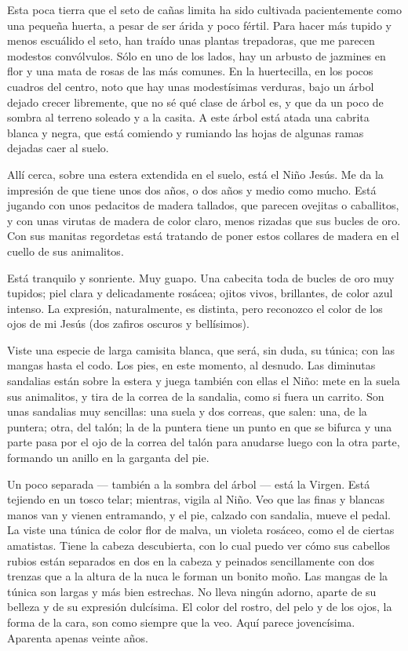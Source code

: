 \documentclass[12pt]{book} %
\begin{document}
Esta poca tierra que el seto de cañas limita ha sido cultivada pacientemente como una pequeña huerta, a pesar de ser árida y poco fértil. Para hacer más tupido y menos escuálido el seto, han traído unas plantas trepadoras, que me parecen modestos convólvulos. Sólo en uno de los lados, hay un arbusto de jazmines en flor y una mata de rosas de las más comunes. En la huertecilla, en los pocos cuadros del centro, noto que hay unas modestísimas verduras, bajo un árbol dejado crecer libremente, que no sé qué clase de árbol es, y que da un poco de sombra al terreno soleado y a la casita. A este árbol está atada una cabrita blanca y negra, que está comiendo y rumiando las hojas de algunas ramas dejadas caer al suelo. 

Allí cerca, sobre una estera extendida en el suelo, está el Niño Jesús. Me da la impresión de que tiene unos dos años, o dos años y medio como mucho. Está jugando con unos pedacitos de madera tallados, que parecen ovejitas o caballitos, y con unas virutas de madera de color claro, menos rizadas que sus bucles de oro. Con sus manitas regordetas está tratando de poner estos collares de madera en el cuello de sus animalitos. 

Está tranquilo y sonriente. Muy guapo. Una cabecita toda de bucles de oro muy tupidos; piel clara y delicadamente rosácea; ojitos vivos, brillantes, de color azul intenso. La expresión, naturalmente, es distinta, pero reconozco el color de los ojos de mi Jesús (dos zafiros oscuros y bellísimos). 

Viste una especie de larga camisita blanca, que será, sin duda, su túnica; con las mangas hasta el codo. Los pies, en este momento, al desnudo. Las diminutas sandalias están sobre la estera y juega también con ellas el Niño: mete en la suela sus animalitos, y tira de la correa de la sandalia, como si fuera un carrito. Son unas sandalias muy sencillas: una suela y dos correas, que salen: una, de la puntera; otra, del talón; la de la puntera tiene un punto en que se bifurca y una parte pasa por el ojo de la correa del talón para anudarse luego con la otra parte, formando un anillo en la garganta del pie. 

Un poco separada — también a la sombra del árbol — está la Virgen. Está tejiendo en un tosco telar; mientras, vigila al Niño. Veo que las finas y blancas manos van y vienen entramando, y el pie, calzado con sandalia, mueve el pedal. La viste una túnica de color flor de malva, un violeta rosáceo, como el de ciertas amatistas. Tiene la cabeza descubierta, con lo cual puedo ver cómo sus cabellos rubios están separados en dos en la cabeza y peinados sencillamente con dos trenzas que a la altura de la nuca le forman un bonito moño. Las mangas de la túnica son largas y más bien estrechas. No lleva ningún adorno, aparte de su belleza y de su expresión dulcísima. El color del rostro, del pelo y de los ojos, la forma de la cara, son como siempre que la veo. Aquí parece jovencísima. Aparenta apenas veinte años. 
\end{document}
